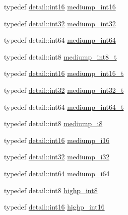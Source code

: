\begin{DoxyCompactItemize}
\item 
typedef \hyperlink{stb__image_8c_a259fa4834387bd68627ddf37bb3ebdb9}{detail\+::int16} \hyperlink{group__gtc__type__precision_ga4611997edb6c61606daa11990cf08798}{mediump\+\_\+int16}
\item 
typedef \hyperlink{stb__image_8c_a43d43196463bde49cb067f5c20ab8481}{detail\+::int32} \hyperlink{group__gtc__type__precision_ga0660a752402702f420f13c686a7fff29}{mediump\+\_\+int32}
\item 
typedef detail\+::int64 \hyperlink{group__gtc__type__precision_ga603c695fe5cd677d3f72a81343e19a74}{mediump\+\_\+int64}
\item 
typedef detail\+::int8 \hyperlink{group__gtc__type__precision_ga626ac5f73d3538e62a879d6c56abfb36}{mediump\+\_\+int8\+\_\+t}
\item 
typedef \hyperlink{stb__image_8c_a259fa4834387bd68627ddf37bb3ebdb9}{detail\+::int16} \hyperlink{group__gtc__type__precision_ga478fab608cf43040013d719a3e03b194}{mediump\+\_\+int16\+\_\+t}
\item 
typedef \hyperlink{stb__image_8c_a43d43196463bde49cb067f5c20ab8481}{detail\+::int32} \hyperlink{group__gtc__type__precision_gafd9b4bd9e4465aec63351b59100692c4}{mediump\+\_\+int32\+\_\+t}
\item 
typedef detail\+::int64 \hyperlink{group__gtc__type__precision_ga555a2f85641550c232db473a9bb981f7}{mediump\+\_\+int64\+\_\+t}
\item 
typedef detail\+::int8 \hyperlink{group__gtc__type__precision_ga28a8b5fd51072680bb55178c17cc7411}{mediump\+\_\+i8}
\item 
typedef \hyperlink{stb__image_8c_a259fa4834387bd68627ddf37bb3ebdb9}{detail\+::int16} \hyperlink{group__gtc__type__precision_ga8454fc6a82c7bb787d0ac9663e08f63d}{mediump\+\_\+i16}
\item 
typedef \hyperlink{stb__image_8c_a43d43196463bde49cb067f5c20ab8481}{detail\+::int32} \hyperlink{group__gtc__type__precision_ga5e00ec824eb55968a6b6496f294d8c07}{mediump\+\_\+i32}
\item 
typedef detail\+::int64 \hyperlink{group__gtc__type__precision_ga90fedf6c701ffbe00535156715e50787}{mediump\+\_\+i64}
\item 
typedef detail\+::int8 \hyperlink{group__gtc__type__precision_ga57c86999e666760c304453f9bfdc09d1}{highp\+\_\+int8}
\item 
typedef \hyperlink{stb__image_8c_a259fa4834387bd68627ddf37bb3ebdb9}{detail\+::int16} \hyperlink{group__gtc__type__precision_gaf0430ed80e88c0d1dfbe47f359659c81}{highp\+\_\+int16}
\item 

\end{DoxyCompactItemize}
